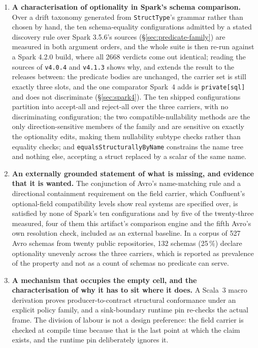 \begin{enumerate}[leftmargin=1.5em]
  \item \textbf{A characterisation of optionality in Spark's schema comparison.} Over a drift taxonomy generated from \texttt{StructType}'s grammar rather than chosen by hand, the ten schema-equality configurations admitted by a stated discovery rule over Spark 3.5.6's sources (\S\ref{sec:predicate-family}) are measured in both argument orders, and the whole suite is then re-run against a Spark 4.2.0 build, where all 2668 verdicts come out identical; reading the sources of \texttt{v4.0.4} and \texttt{v4.1.3} shows why, and extends the result to the releases between: the predicate bodies are unchanged, the carrier set is still exactly three slots, and the one comparator Spark~4 adds is \texttt{private[sql]} and does not discriminate (\S\ref{sec:spark4}). The ten shipped configurations partition into accept-all and reject-all over the three carriers, with no discriminating configuration; the two compatible-nullability methods are the only direction-sensitive members of the family and are sensitive on exactly the optionality edits, making them nullability subtype checks rather than equality checks; and \texttt{equalsStructurallyByName} constrains the name tree and nothing else, accepting a struct replaced by a scalar of the same name.
  \item \textbf{An externally grounded statement of what is missing, and evidence that it is wanted.} The conjunction of Avro's name-matching rule and a directional containment requirement on the field carrier, which Confluent's optional-field compatibility levels show real systems are specified over, is satisfied by none of Spark's ten configurations and by five of the twenty-three measured, four of them this artifact's comparison engine and the fifth Avro's own resolution check, included as an external baseline. In a corpus of 527 Avro schemas from twenty public repositories, 132 schemas (25\,\%) declare optionality unevenly across the three carriers, which is reported as prevalence of the property and not as a count of schemas no predicate can serve.
  \item \textbf{A mechanism that occupies the empty cell, and the characterisation of why it has to sit where it does.} A Scala~3 macro derivation proves producer-to-contract structural conformance under an explicit policy family, and a sink-boundary runtime pin re-checks the actual frame. The division of labour is not a design preference: the field carrier is checked at compile time because that is the last point at which the claim exists, and the runtime pin deliberately ignores it.
\end{enumerate}

